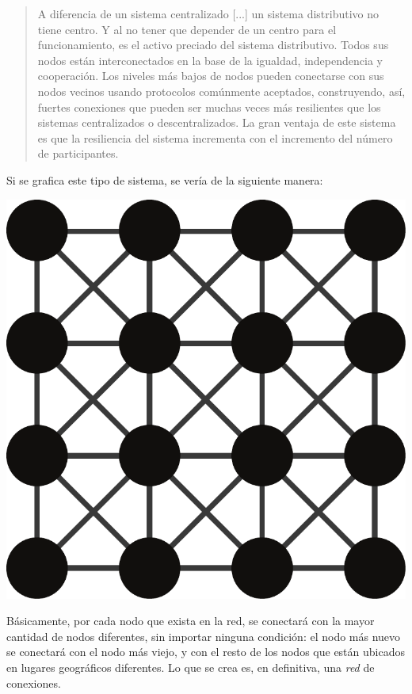 \documentclass[12pt,a4paper,twoside]{book}
\begin{document}
\begin{quotation}
A diferencia de un sistema centralizado [...] un sistema distributivo no tiene centro. Y al no tener que depender de un centro para el funcionamiento, es el activo preciado del sistema distributivo. Todos sus nodos están interconectados en la base de la igualdad, independencia y cooperación. Los niveles más bajos de nodos pueden conectarse con sus nodos vecinos usando protocolos comúnmente aceptados, construyendo, así, fuertes conexiones que pueden ser muchas veces más resilientes que los sistemas centralizados o descentralizados. La gran ventaja de este sistema es que la resiliencia del sistema incrementa con el incremento del número de participantes. \cite{sist:cffn}
\end{quotation}

Si se grafica este tipo de sistema, se vería de la siguiente manera:

\begin{center}
\includegraphics[scale=0.25]{img/tiposist-distri.pdf}
\end{center}

Básicamente, por cada nodo que exista en la red, se conectará con la mayor cantidad de nodos diferentes, sin importar ninguna condición: el nodo más nuevo se conectará con el nodo más viejo, y con el resto de los nodos que están ubicados en lugares geográficos diferentes. Lo que se crea es, en definitiva, una \textit{red} de conexiones.
\end{document}
